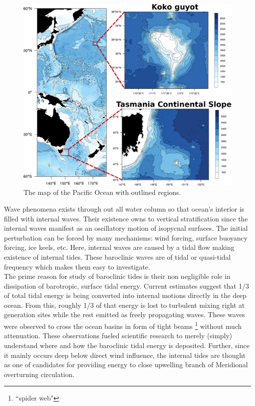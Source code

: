 \begin{figure}
\includegraphics[scale=0.5]{../figures/map_w_places.pdf}
\caption{The map of the Pacific Ocean with outlined regions.}
\end{figure}
Wave phenomena exists through out all water column so that ocean's interior is filled with internal waves. Their existence owns to vertical stratification since the internal waves manifest as an oscillatory motion of isopycnal surfaces. The initial perturbation can be forced by many mechanisms: wind forcing, surface buoyancy forcing, ice keels, etc. Here, internal waves are caused by a tidal flow making existence of internal tides. These baroclinic waves are of tidal or quasi-tidal frequency which makes them easy to investigate.\\
The prime reason for study of baroclinic tides is their non negligible role in dissipation of barotropic, surface tidal energy. Current estimates suggest that 1/3 of total tidal energy is being converted into internal motions directly in the deep ocean. From this, roughly 1/3 of that energy is lost to turbulent mixing right at generation sites while the rest emitted as freely propagating waves. These waves were observed to cross the ocean basins in form of tight beams \footnote{``spider web"} without much attenuation. These observations fueled scientific research to merely (simply) understand where and how the baroclinic tidal energy is deposited. Further, since it mainly occurs deep below direct wind influence, the internal tides are thought as one of candidates for providing energy to close upwelling branch of Meridional overturning circulation.\\
